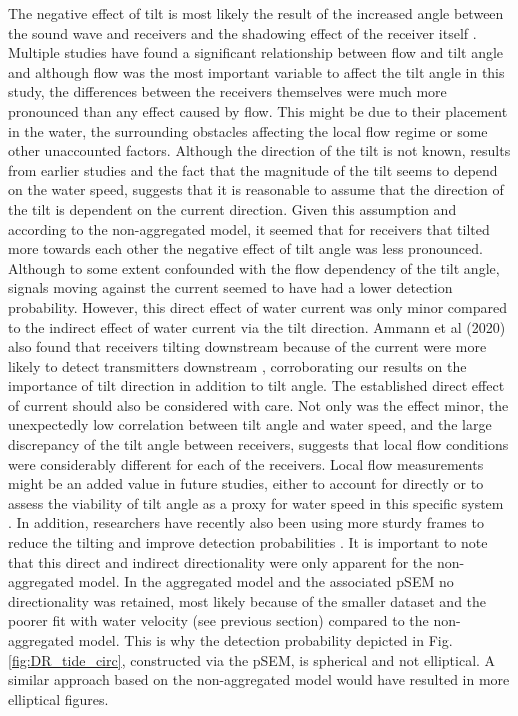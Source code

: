 \documentclass[doublespacing,linenumbers]{bmcart}
\begin{document}
The negative effect of tilt is most likely the result of the increased angle between the sound wave and receivers and the shadowing effect of the receiver itself \cite{Ammann2020FactorsSystem}. Multiple studies have found a significant relationship between flow and tilt angle \cite{Becker2021} and although flow was the most important variable to affect the tilt angle in this study, the differences between the receivers themselves were much more pronounced than any effect caused by flow. This might be due to their placement in the water, the surrounding obstacles affecting the local flow regime or some other unaccounted factors. Although the direction of the tilt is not known, results from earlier studies \cite{Becker2021} and the fact that the magnitude of the tilt seems to depend on the water speed, suggests that it is reasonable to assume that the direction of the tilt is dependent on the current direction. Given this assumption and according to the non-aggregated model, it seemed that for receivers that tilted more towards each other the negative effect of tilt angle was less pronounced. Although to some extent confounded with the flow dependency of the tilt angle, signals moving against the current seemed to have had a lower detection probability. However, this direct effect of water current was only minor compared to the indirect effect of water current via the tilt direction. Ammann et al (2020) also found that receivers tilting downstream because of the current were more likely to detect transmitters downstream \cite{Ammann2020FactorsSystem}, corroborating our results on the importance of tilt direction in addition to tilt angle. The established direct effect of current should also be considered with care. Not only was the effect minor, the unexpectedly low correlation between tilt angle and water speed, and the large discrepancy of the tilt angle between receivers, suggests that local flow conditions were considerably different for each of the receivers. Local flow measurements might be an added value in future studies, either to account for directly or to assess the viability of tilt angle as a proxy for water speed in this specific system \cite{Becker2021}. In addition, researchers have recently also been using more sturdy frames to reduce the tilting and improve detection probabilities \cite{Goossens2020MooringReceivers}. It is important to note that this direct and indirect directionality were only apparent for the non-aggregated model. In the aggregated model and the associated pSEM no directionality was retained, most likely because of the smaller dataset and the poorer fit with water velocity (see previous section) compared to the non-aggregated model. This is why the detection probability depicted in Fig. \ref{fig:DR_tide_circ}, constructed via the pSEM, is spherical and not elliptical. A similar approach based on the non-aggregated model would have resulted in more elliptical figures.
\end{document}
